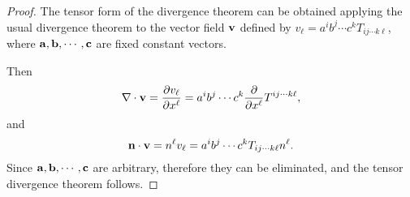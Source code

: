 \begin{proof}
  The tensor form of the divergence theorem can be obtained applying  the usual divergence theorem to the vector field $\mathbf{ v}$ defined by $v_\ell = a^i b^j \cdots c^k T_{ij\cdots k\ell}$, where $\mathbf{ a}, \mathbf{ b}, \cdots, \mathbf{ c}$ are fixed constant vectors.

  Then
  \[
    \nabla\cdot \mathbf{ v} = \dfrac{\partial v_\ell}{\partial x^\ell} = a^i b^j \cdots c^k \dfrac{\partial}{\partial x^\ell}T^{ij\cdots k\ell},
  \]
  and
  \[
    \mathbf{ n}\cdot \mathbf{ v} = n^\ell v_\ell = a^i b^j \cdots c^k T_{ij\cdots k\ell }n^\ell.
  \]
  Since $\mathbf{ a}, \mathbf{ b}, \cdots, \mathbf{ c}$ are arbitrary, therefore they can be eliminated, and the tensor divergence theorem follows.
\end{proof}
% 
